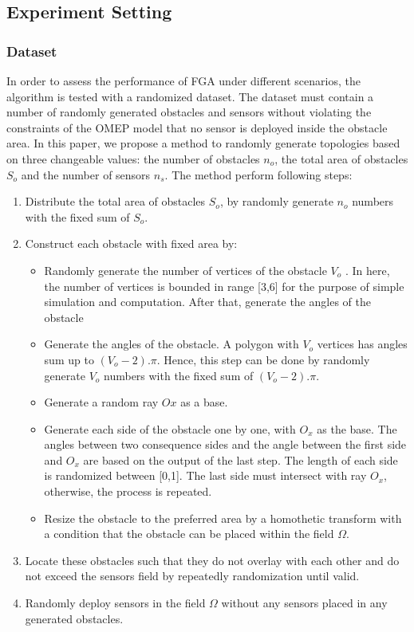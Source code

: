 \documentclass[final]{elsarticle}
\begin{document}
\subsection{Experiment Setting}
\subsubsection{Dataset}

In order to assess the performance of FGA under different scenarios, the algorithm is tested with a randomized dataset. The dataset must contain a number of randomly generated obstacles and sensors without violating the constraints of the OMEP model that no sensor is deployed inside the obstacle area. In this paper, we propose a method to randomly generate topologies based on three changeable values: the number of obstacles $n_o$, the total area of obstacles $S_o$ and the number of sensors $n_s$. The method perform following steps: 


\begin{enumerate}
	\item Distribute the total area of obstacles $S_o$, by randomly generate $n_o$ numbers with the fixed sum of $S_o$.
	\item Construct each obstacle with fixed area by:
	\begin{itemize}
		\item Randomly generate the number of vertices of the obstacle $V_o$ . In here, the number of vertices is bounded in range [3,6] for the purpose of simple simulation and computation. After that, generate the angles of the obstacle 
		\item Generate the angles of the obstacle. A polygon with $V_o$ vertices has angles sum up to $(V_o - 2).\pi$. Hence, this step can be done by randomly generate $V_o$ numbers with the fixed sum of $(V_o - 2).\pi$.
		\item Generate a random ray $Ox$ as a base.
		\item Generate each side of the obstacle one by one, with $O_x$ as the base. The angles between two consequence sides and the angle between the first side and $O_x$ are based on the output of the last step. The length of each side is randomized between [0,1]. The last side must intersect with ray $O_x$, otherwise, the process is repeated.
		\item Resize the obstacle to the preferred area by a homothetic transform with a condition that the obstacle can be placed within the field $\Omega$.
	\end{itemize}
	\item Locate these obstacles such that they do not overlay with each other and do not exceed the sensors field by repeatedly randomization until valid.
	\item Randomly deploy sensors in the field $\Omega$ without any sensors placed in any generated obstacles.
\end{enumerate}
\end{document}
